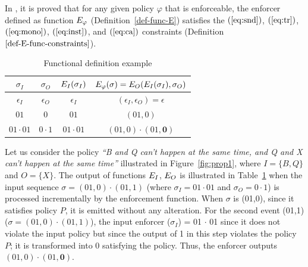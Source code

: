 \squishend
\begin{remark}
	\label{prop-constraints-funcdef}
	In \cite{spin17}, it is proved that for any given policy $\varphi$ that is enforceable, the enforcer defined as function $E_{\varphi}$ (Definition~\ref{def-func-E}) satisfies the $(\ref{eq:snd})$,
	$(\ref{eq:tr})$, $(\ref{eq:mono})$, $(\ref{eq:inst})$, and $(\ref{eq:ca})$ constraints (Definition $\ref{def-E-func-constraints}$).
\end{remark}

%
\begin{table}[t]
	\centering
	\begin{tabular}{|c|c|c|c|}
		\hline
		$\sigma_I$ & $\sigma_O$ & $E_{I}(\sigma_I)$ & $E_{\varphi}(\sigma)=E_{O}(E_{I}(\sigma_I), \sigma_O)$ \\
		\hline%
		$\epsilon_I$ & $\epsilon_O$ & $\epsilon_I$ & $(\epsilon_I,\epsilon_O) = \epsilon$\\
		\hline
		$01$ & $0$ & $01$ & $(01,0)$ \\
		\hline
		$01\cdot 01$ & $0\cdot1$ & $01\cdot01$ & $(01,0)\cdot(01,\textbf{0})$ \\
		\hline
	\end{tabular}
	\caption{Functional definition example}
	\label{tableEgFuncDef}
\end{table}
\begin{example}
	\label{eg:funcDef}
	Let us consider the policy \textit{``B and Q can't happen at the same time, and Q and X can't happen at the same time''} illustrated in Figure~\ref{fig:prop1}, where $I= \{B,Q\}$ and $O=\{ X \}$.
	The output of functions $E_{I}$, $E_{O}$ is illustrated in Table~\ref{tableEgFuncDef} when the input sequence $\sigma = (01,0)\cdot(01,1)$ (where $\sigma_I = 01\cdot01$ and $\sigma_O= 0\cdot1$) is processed incrementally by the enforcement function. When $\sigma$ is (01,0), since it satisfies policy $P$, it is emitted without any alteration. For the second event  (01,1) ($\sigma = (01,0)\cdot(01,1)$), the input enforcer \efi({$\sigma_{I}$}) = 01 $\cdot$ 01 since it does not violate the input policy but since the output of 1 in this step violates the policy $P$; it is transformed into 0 satisfying the policy. Thus, the enforcer outputs $(01,0)\cdot(01,\textbf{0})$.
\end{example}

